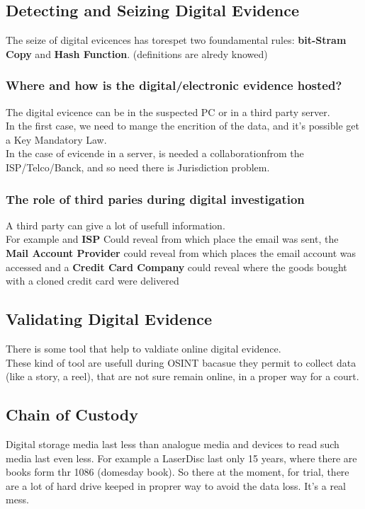 \subsection{Detecting and Seizing Digital Evidence}
The seize of digital evicences has torespet two foundamental rules: \textbf{bit-Stram Copy} and
\textbf{Hash Function}. (definitions are alredy knowed)

\subsubsection{Where and how is the digital/electronic evidence hosted?}
The digital evicence can be in the suspected PC or in a third party server. \\
In the first case, we need to mange the encrition of the data, and it's possible get a Key Mandatory Law. \\
In the case of evicende in a server, is needed a collaborationfrom the ISP/Telco/Banck, and so need there is Jurisdiction problem.

\subsubsection{The role of third paries during digital investigation}

A third party can give a lot of usefull information. \\
For example and \textbf{ISP} Could reveal from which place the email was sent, the \textbf{Mail Account Provider} could reveal from which places the email account was accessed and a \textbf{Credit Card Company} could reveal where the goods bought with a cloned credit card were delivered

\subsection{Validating Digital Evidence}
There is some tool that help to valdiate online digital evidence. \\
These kind of tool are usefull during OSINT bacasue they permit to collect data (like a story, a reel), that are not sure remain online, in a proper way for a court.

\subsection{Chain of Custody}

Digital storage media last less than analogue media and devices to read such media last even less. For example a LaserDisc last only 15 years, where there are books form thr 1086 (domesday book). So there at the moment, for trial, there are a lot of hard drive keeped in proprer way to avoid the data loss. It's a real mess.

